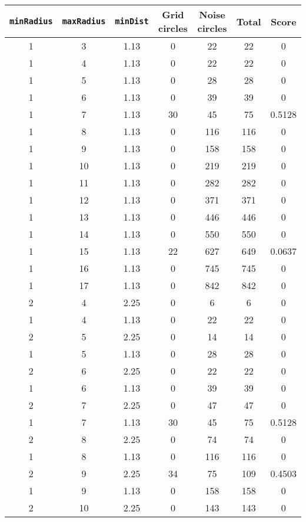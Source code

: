 \documentclass[letterpaper, 12pt]{article}
\begin{document}
\begin{longtable}{|c|c|c|c|c|c|c|}
\hline
\textbf{\texttt{minRadius}} & \textbf{\texttt{maxRadius}} & \textbf{\texttt{minDist}} & \textbf{Grid circles} & \textbf{Noise circles} & \textbf{Total} & \textbf{Score} \\
\hline
1 & 3 & 1.13 & 0 & 22 & 22 & 0 \\
\hline
1 & 4 & 1.13 & 0 & 22 & 22 & 0 \\
\hline
1 & 5 & 1.13 & 0 & 28 & 28 & 0 \\
\hline
1 & 6 & 1.13 & 0 & 39 & 39 & 0 \\
\hline
1 & 7 & 1.13 & 30 & 45 & 75 & 0.5128 \\
\hline
1 & 8 & 1.13 & 0 & 116 & 116 & 0 \\
\hline
1 & 9 & 1.13 & 0 & 158 & 158 & 0 \\
\hline
1 & 10 & 1.13 & 0 & 219 & 219 & 0 \\
\hline
1 & 11 & 1.13 & 0 & 282 & 282 & 0 \\
\hline
1 & 12 & 1.13 & 0 & 371 & 371 & 0 \\
\hline
1 & 13 & 1.13 & 0 & 446 & 446 & 0 \\
\hline
1 & 14 & 1.13 & 0 & 550 & 550 & 0 \\
\hline
1 & 15 & 1.13 & 22 & 627 & 649 & 0.0637 \\
\hline
1 & 16 & 1.13 & 0 & 745 & 745 & 0 \\
\hline
1 & 17 & 1.13 & 0 & 842 & 842 & 0 \\
\hline
2 & 4 & 2.25 & 0 & 6 & 6 & 0 \\
\hline
1 & 4 & 1.13 & 0 & 22 & 22 & 0 \\
\hline
2 & 5 & 2.25 & 0 & 14 & 14 & 0 \\
\hline
1 & 5 & 1.13 & 0 & 28 & 28 & 0 \\
\hline
2 & 6 & 2.25 & 0 & 22 & 22 & 0 \\
\hline
1 & 6 & 1.13 & 0 & 39 & 39 & 0 \\
\hline
2 & 7 & 2.25 & 0 & 47 & 47 & 0 \\
\hline
1 & 7 & 1.13 & 30 & 45 & 75 & 0.5128 \\
\hline
2 & 8 & 2.25 & 0 & 74 & 74 & 0 \\
\hline
1 & 8 & 1.13 & 0 & 116 & 116 & 0 \\
\hline
2 & 9 & 2.25 & 34 & 75 & 109 & 0.4503 \\
\hline
1 & 9 & 1.13 & 0 & 158 & 158 & 0 \\
\hline
2 & 10 & 2.25 & 0 & 143 & 143 & 0 \\

\end{longtable}
\end{document}
